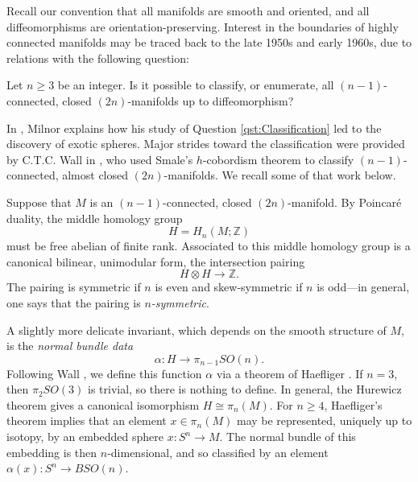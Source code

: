 Recall our convention that all manifolds are smooth and oriented, and all diffeomorphisms are orientation-preserving.
Interest in the boundaries of highly connected manifolds may be traced back to the late 1950s and early 1960s, due to relations with the following question:

\begin{qst} \label{qst:Classification}
Let $n \ge 3$ be an integer.
Is it possible to classify, or enumerate, all $(n-1)$-connected, closed $(2n)$-manifolds up to diffeomorphism?
\end{qst}

In \cite{MilnorTalk}, Milnor explains how his study of Question \ref{qst:Classification} led to the discovery of exotic spheres.  Major strides toward the classification were provided by C.T.C. Wall in \cite{Wall62}, who used Smale's $h$-cobordism theorem to classify $(n-1)$-connected, almost closed $(2n)$-manifolds.  We recall some of that work below.

\begin{rec} \label{rec:manifoldinvariants}
Suppose that $M$ is an $(n-1)$-connected, closed $(2n)$-manifold.
By Poincar\'e duality, the middle homology group 
$$H=H_n(M;\mathbb{Z})$$
must be free abelian of finite rank.
Associated to this middle homology group is a canonical bilinear, unimodular form, the intersection pairing
$$H \otimes H \to \mathbb{Z}.$$
The pairing is symmetric if $n$ is even and skew-symmetric if $n$ is odd---in general, one says that the pairing is \emph{$n$-symmetric}.

A slightly more delicate invariant, which depends on the smooth structure of $M$, is the \emph{normal bundle data}
$$\alpha:H \to \pi_{n-1}SO(n).$$
Following Wall \cite{Wall62}, we define this function $\alpha$ via a theorem of Haefliger \cite{Haefliger}.
If $n=3$, then $\pi_2 SO(3)$ is trivial, so there is nothing to define. In general, the Hurewicz theorem gives a canonical isomorphism $H \cong \pi_n(M)$.
For $n \ge 4$,  Haefliger's theorem implies that an element $x \in \pi_n(M)$ may be represented, uniquely up to isotopy, by an embedded sphere $x:S^n \to M$.
The normal bundle of this embedding is then $n$-dimensional, and so classified by an element $\alpha(x):S^n \to BSO(n)$.
\end{rec}

